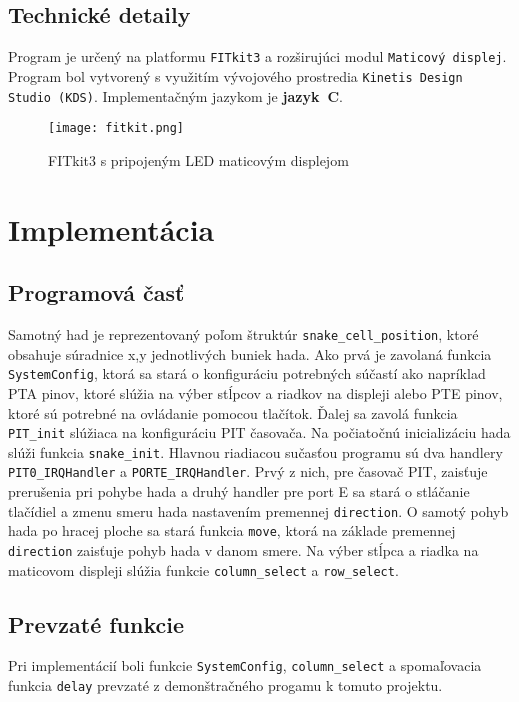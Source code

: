 \documentclass[a4paper, 11pt]{article}
\begin{document}
\subsection{Technické detaily}
Program je určený na platformu \texttt{FITkit3} a rozširujúci modul \texttt{Maticový displej}. Program bol vytvorený s využitím vývojového prostredia \texttt{Kinetis Design Studio (KDS)}. 
Implementačným jazykom je \textbf{jazyk~C}.

\begin{figure}[h]
\begin{center}
\texttt{[image: fitkit.png]}
\caption{FITkit3 s pripojeným LED maticovým displejom}
\end{center}
\end{figure}
\section{Implementácia}
\subsection{Programová časť}
Samotný had je reprezentovaný poľom štruktúr \texttt{snake\_cell\_position}, ktoré obsahuje súradnice x,y jednotlivých buniek hada. Ako prvá je zavolaná funkcia \texttt{SystemConfig}, ktorá sa stará o konfiguráciu potrebných súčastí ako napríklad PTA pinov, ktoré slúžia na výber stĺpcov a riadkov na displeji alebo PTE pinov, ktoré sú potrebné na ovládanie pomocou tlačítok. Ďalej sa zavolá funkcia \texttt{PIT\_init} slúžiaca na konfiguráciu PIT časovača. Na počiatočnú inicializáciu hada slúži funkcia \texttt{snake\_init}. Hlavnou riadiacou sučasťou programu sú dva handlery \texttt{PIT0\_IRQHandler} a \texttt{PORTE\_IRQHandler}. Prvý z nich, pre časovač PIT, zaisťuje prerušenia pri pohybe hada a druhý handler pre port E sa stará o stláčanie tlačídiel a zmenu smeru hada nastavením premennej \texttt{direction}. O samotý pohyb hada po hracej ploche sa stará funkcia \texttt{move}, ktorá na základe premennej \texttt{direction} zaisťuje pohyb hada v danom smere. Na výber stĺpca a riadka na maticovom displeji slúžia funkcie \texttt{column\_select} a \texttt{row\_select}.

\subsection{Prevzaté funkcie}
Pri implementácií boli funkcie \texttt{SystemConfig}, \texttt{column\_select} a spomaľovacia funkcia \texttt{delay} prevzaté z demonštračného progamu k tomuto projektu.
\end{document}
